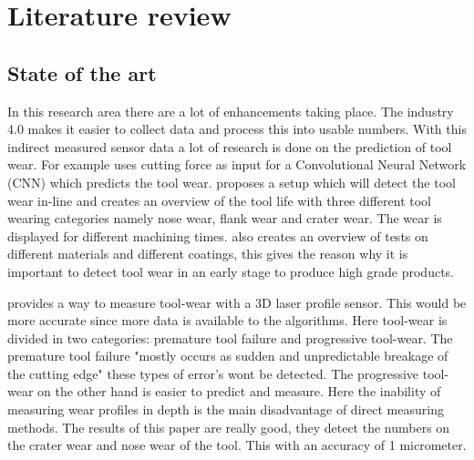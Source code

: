 
\chapter{Literature review}
\label{chap:lit}

\section{State of the art}

           
		In this research area there are a lot of enhancements taking place. The industry 4.0 makes it easier to collect data and process this into usable numbers. With this indirect measured sensor data a lot of research is done on the prediction of tool wear. For example \cite{Ma2020} uses cutting force as input for a Convolutional Neural Network (CNN) which predicts the tool wear.
		 \cite{Li2013} proposes a setup which will detect the tool wear in-line and creates an overview of the tool life with three different tool wearing categories namely nose wear, flank wear and crater wear. The wear is displayed for different machining times.  \cite{Li2013} also creates an overview of tests on different materials and different coatings, this gives the reason why it is important to detect tool wear in an early stage to produce high grade products.
		
		 \cite{Cerce2015} provides a way to measure tool-wear with a 3D laser profile sensor. This would be more accurate since more data is available to the algorithms. Here tool-wear is divided in two categories: premature tool failure and progressive tool-wear. The premature tool failure "mostly occurs as sudden and unpredictable breakage of the cutting edge" these types of error's wont be detected. The progressive tool-wear on the other hand is easier to predict and measure. Here the inability of measuring wear profiles in depth is the main disadvantage of direct measuring methods. The results of this paper are really good, they detect the numbers on the crater wear and nose wear of the tool. This with an accuracy of 1 micrometer. 
		 
